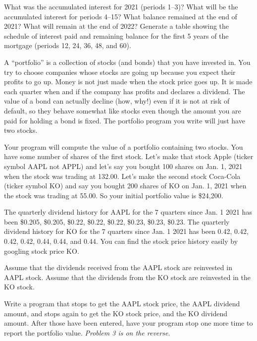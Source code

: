 What was the accumulated interest for 2021 (periods 1--3)? What will be the accumulated interest for periods 4--15? What balance remained at the end of 2021? What will remain at the end of 2022? Generate a table showing the schedule of interest paid and remaining balance for the first 5 years of the mortgage (periods 12, 24, 36, 48, and 60).

\bigskip

\nobreak\bigskip

\noindent A ``portfolio'' is a collection of stocks (and bonds) that you have invested in. You try to choose companies whose stocks are going up because you expect their profits to go up. Money is not just made when the stock price goes up. It is made each quarter when and if the company has profits and declares a dividend. The value of a bond can actually decline (how, why!) even if it is not at risk of default, so they behave somewhat like stocks even though the amount you are paid for holding a bond is fixed. The portfolio program you write will just have two stocks.

Your program will compute the value of a portfolio containing two stocks. You have some number of shares of the first stock. Let's make that stock Apple (ticker symbol AAPL not APPL) and let's say you bought 100 shares on Jan. 1, 2021 when the stock was trading at 132.00.  Let's make the second stock Coca-Cola (ticker symbol KO) and say you bought 200 shares of KO on Jan. 1, 2021 when the stock was trading at 55.00. So your initial portfolio value is \$24,200.

The quarterly dividend history for AAPL for the 7 quarters since Jan. 1 2021 has been \$0.205, \$0.205, \$0.22, \$0.22, \$0.22, \$0.23, \$0.23, \$0.23. The quarterly dividend history for KO for the 7 quarters since Jan. 1 2021 has been 0.42, 0.42, 0.42, 0.42, 0.44, 0.44, and 0.44. You can find the stock price history easily by googling stock price KO.

Assume that the dividends received from the AAPL stock are reinvested in AAPL stock. Assume that the dividends from the KO stock are reinvested in the KO stock.

Write a program that stops to get the AAPL stock price, the AAPL dividend amount, and stops again to get the KO stock price, and the KO dividend amount. After those have been entered, have your program stop one more time to report the portfolio value. {\it Problem 3 is on the reverse.}

